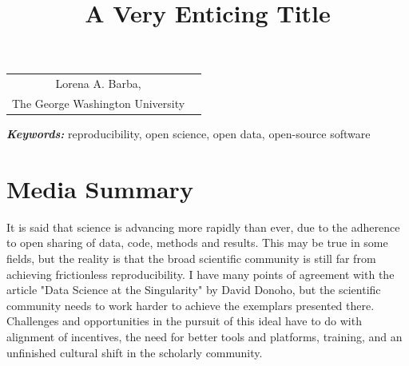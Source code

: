 \documentclass[]{hdsr}
\begin{document}




\begin{center}

  \title{A Very Enticing Title}
  \maketitle

  \thispagestyle{empty}
  
  \vspace*{.2in}

  \begin{tabular}{cc}
    Lorena A. Barba\upstairs{\affilone,*},
   \\[0.25ex]
   {\small \upstairs{\affilone} The George Washington University} \\
  \end{tabular}
  
  \vspace*{0.4in}

\end{center}

\vspace*{0.15in}
\hspace{10pt}
  \small	
  \textbf{\textit{Keywords: }} {reproducibility, open science, open data, open-source software}
  
\copyrightnotice

\section*{Media Summary}

It is said that science is advancing more rapidly than ever, due to the adherence to open sharing of data, code, methods and results. This may be true in some fields, but the reality is that the broad scientific community is still far from achieving frictionless reproducibility. I have many points of agreement with the article "Data Science at the Singularity" by David Donoho, but the scientific community needs to work harder to achieve the exemplars presented there. Challenges and opportunities in the pursuit of this ideal have to do with alignment of incentives, the need for better tools and platforms, training, and an unfinished cultural shift in the scholarly community.
\end{document}

